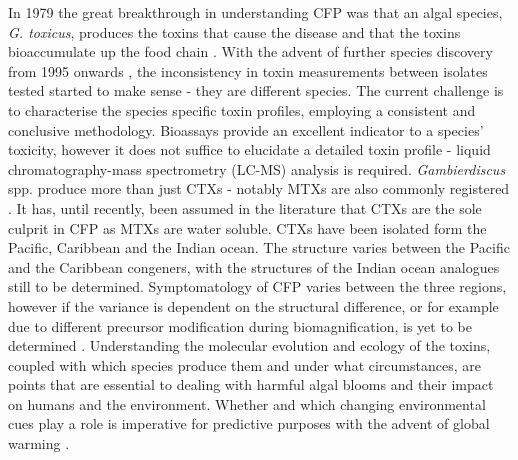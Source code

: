 \documentclass[12pt]{article}
\begin{document}
In 1979 the great breakthrough in understanding CFP was that an algal species, \emph{G. toxicus}, produces the toxins that cause the disease and that the toxins bioaccumulate up the food chain \citep{adachi1979thecal}. With the advent of further species discovery from 1995 onwards \cite{faust1995observation}, the inconsistency in toxin measurements between isolates tested started to make sense - they are different species. The current challenge is to characterise the species specific toxin profiles, employing a consistent and conclusive methodology. Bioassays provide an excellent indicator to a species' toxicity, however it does not suffice to elucidate a detailed toxin profile - liquid chromatography-mass spectrometry (LC-MS) analysis is required. \emph{Gambierdiscus} spp. produce more than just CTXs - notably MTXs are also commonly registered \cite{holmes1994purification,murata1993structure}. It has, until recently, been assumed in the literature that CTXs are the sole culprit in CFP as MTXs are water soluble. CTXs have been isolated form the Pacific, Caribbean and the Indian ocean. The  structure varies between the Pacific and the Caribbean congeners, with the structures of the Indian ocean analogues still to be determined. Symptomatology of CFP varies between the three regions, however if the variance is dependent on  the structural difference, or for example due to different precursor modification during biomagnification, is yet to be determined \cite{lewis2006ciguatera}. Understanding the molecular evolution and ecology of the toxins, coupled with which species produce them and under what circumstances, are points that are essential to dealing with harmful algal blooms and their impact on humans and the environment. Whether and which changing environmental cues play a role is imperative for predictive purposes with the advent of global warming \cite{llewellyn2010revisiting}.  \\
\end{document}

